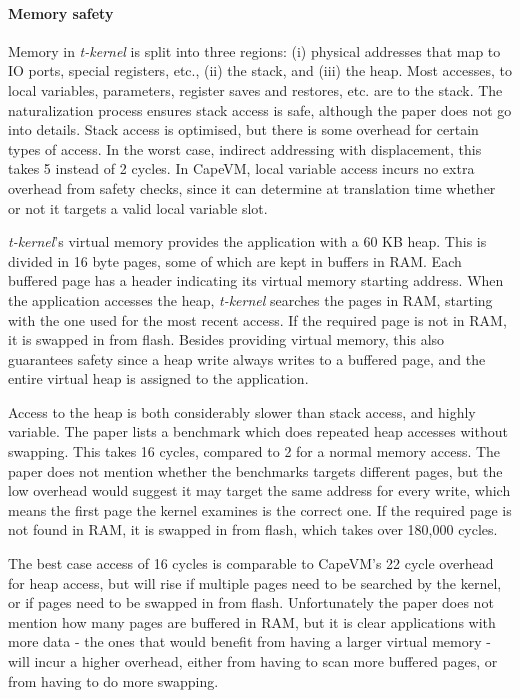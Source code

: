 \paragraph{Memory safety}
Memory in \emph{t-kernel} is split into three regions: (i) physical addresses that map to IO ports, special registers, etc., (ii) the stack, and (iii) the heap. Most accesses, to local variables, parameters, register saves and restores, etc. are to the stack. The naturalization process ensures stack access is safe, although the paper does not go into details. Stack access is optimised, but there is some overhead for certain types of access. In the worst case, indirect addressing with displacement, this takes 5 instead of 2 cycles. In CapeVM, local variable access incurs no extra overhead from safety checks, since it can determine at translation time whether or not it targets a valid local variable slot.

\emph{t-kernel}'s virtual memory provides the application with a 60 KB heap. This is divided in 16 byte pages, some of which are kept in buffers in RAM. Each buffered page has a header indicating its virtual memory starting address. When the application accesses the heap, \emph{t-kernel} searches the pages in RAM, starting with the one used for the most recent access. If the required page is not in RAM, it is swapped in from flash. Besides providing virtual memory, this also guarantees safety since a heap write always writes to a buffered page, and the entire virtual heap is assigned to the application.

Access to the heap is both considerably slower than stack access, and highly variable. The paper lists a benchmark which does repeated heap accesses without swapping. This takes 16 cycles, compared to 2 for a normal memory access. The paper does not mention whether the benchmarks targets different pages, but the low overhead would suggest it may target the same address for every write, which means the first page the kernel examines is the correct one. If the required page is not found in RAM, it is swapped in from flash, which takes over 180,000 cycles.

The best case access of 16 cycles is comparable to CapeVM's 22 cycle overhead for heap access, but will rise if multiple pages need to be searched by the kernel, or if pages need to be swapped in from flash. Unfortunately the paper does not mention how many pages are buffered in RAM, but it is clear applications with more data - the ones that would benefit from having a larger virtual memory - will incur a higher overhead, either from having to scan more buffered pages, or from having to do more swapping.

